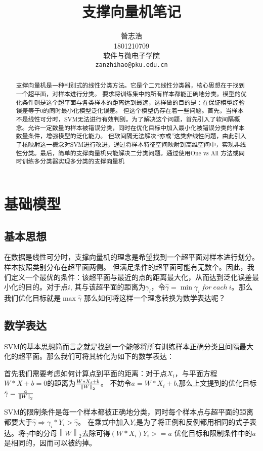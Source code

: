 \documentclass{article}
\title{支撑向量机笔记}
\author{%
  昝志浩\\
  1801210709\\
  软件与微电子学院\\
  \texttt{zanzhihao@pku.edu.cn} \\
}
\begin{document}
\maketitle

\begin{abstract}
  
支撑向量机是一种判别式的线性分类方法。它是个二元线性分类器，核心思想在于找到一个超平面，对样本进行分类。
要求将训练集中的所有样本都能正确地分类。模型的优化条件则是这个超平面与各类样本的距离达到最远，这样做的目的是：在保证模型经验误差等于0的同时最小化模型泛化误差。
但这个模型仍存在着一些问题。首先，当样本不是线性可分时，SVM无法进行有效判别。为了解决这个问题，首先引入了软间隔概念。允许一定数量的样本被错误分类，同时在优化目标中加入最小化被错误分类的样本数量条件，增强模型的泛化能力。
但软间隔无法解决“亦或”这类非线性问题，由此引入了核映射这一概念对SVM进行改进，通过将样本特征空间映射到高维空间中，实现非线性分类。最后，简单的支撑向量机只能解决二分类问题。通过使用One vs All 方法或同时训练多分类器实现多分类的支撑向量机
\end{abstract}

\section{基础模型}
\subsection{基本思想}
在数据是线性可分时，支撑向量机的理念是希望找到一个超平面对样本进行划分。样本按照类别分布在超平面两侧。
但满足条件的超平面可能有无数个。因此，我们定义一个最优的条件：该超平面与最近的点的距离最大化，从而达到泛化误差最小化的目的。对于点$i$, 其与该超平面的距离为$\gamma_i$，令$\hat\gamma = \min \gamma_i\ for\ each\ i$。那么我们优化目标就是$\max\hat\gamma$
那么如何将这样一个理念转换为数学表达呢？

\subsection{数学表达}
SVM的基本思想简而言之就是找到一个能够将所有训练样本正确分类且间隔最大化的超平面。那么我们可将其转化为如下的数学表达：

首先我们需要考虑如何计算点到平面的距离：对于点$X_i$，与平面方程$W*X+b=0$的距离为${W*X_i+b}\over{\left\|W\right\|_2}$。
不妨令$a=W*X_i+b$,那么上文提到的优化目标$\hat\gamma={{a}\over{\left\|W\right\|_2}}$

SVM的限制条件是每一个样本都被正确地分类，同时每个样本点与超平面的距离都要大于$\hat\gamma\Rightarrow\gamma_i*Y_i>\hat\gamma$。
在乘式中加入$Y_i$是为了将正例和反例都用相同的式子表达。将$\gamma$中的分母$\left\|W\right\|_2$去除可得$(W*X_i)Y_i>=a$
优化目标和限制条件中的$a$是相同的，因而可以被约掉。
\end{document}
